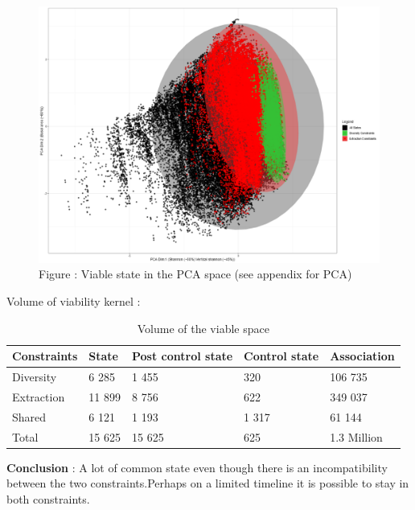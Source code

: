 \documentclass{article}
\begin{document}
\begin{figure}[h]
    \centering
    \includegraphics[width=\textwidth]{Figure/PCA_Viab_kernel_plot.png}
    \caption{Figure : Viable state in the PCA space (see appendix for PCA)}
    \label{fig:PCA_plot}
\end{figure}

Volume of viability kernel : \\

\begin{table}[H]
    \centering
    \begin{tabular}{l l l l l}
    \hline
    \hline
    \textbf{Constraints} & \textbf{State} & \textbf{Post control state} & \textbf{Control state} & \textbf{Association} \\
    \hline
    Diversity  & 6 285 & 1 455 & 320 & 106 735 \\
    Extraction & 11 899 & 8 756 & 622 & 349 037 \\
    Shared & 6 121 & 1 193 & 1 317 & 61 144 \\  
    Total     & 15 625 & 15 625 & 625 & 1.3 Million \\
    \hline
    \hline
    \end{tabular}
    \caption{Volume of the viable space}
    \label{tab:Viab_volume}
\end{table}

\textbf{Conclusion} : A lot of common state even though there is an incompatibility between the two constraints.Perhaps on a limited timeline it is possible to stay in both constraints.\\
\end{document}
